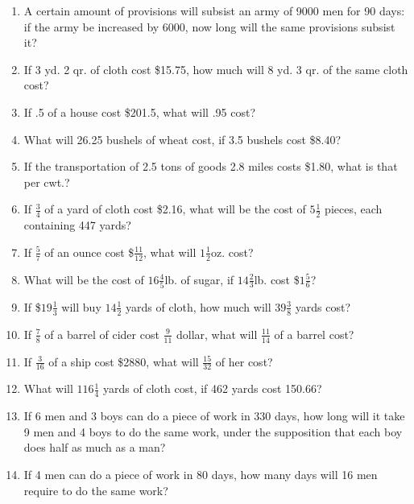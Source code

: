 \documentclass[12pt]{article}
\begin{document}
\begin{enumerate}
\item A certain amount of provisions will subsist an army of 9000 men for 90 days: if the army be increased by 6000, now long will the same provisions subsist it? 
\spacing

\item If 3 yd. 2 qr. of cloth cost \$15.75, how much will 8 yd. 3 qr. of the same cloth cost? 
\spacing

\item If .5 of a house cost \$201.5, what will .95 cost?  
\spacing

\item What will 26.25 bushels of wheat cost, if 3.5 bushels cost \$8.40? 
\spacing

\item If the transportation of 2.5 tons of goods 2.8 miles costs \$1.80, what is that per cwt.? 
\spacing

\item If $\frac{3}{4}$ of a yard of cloth cost \$2.16, what will be the cost of $5\frac{1}{2}$ pieces, each containing 447 yards? 
\spacing

\item If $\frac{5}{7}$ of an ounce cost \$$\frac{11}{12}$, what will $1\frac{1}{2}$oz. cost? 
\spacing

\item What will be the cost of $16\frac{4}{5}$lb. of sugar, if $14\frac{2}{3}$lb. cost \$$1\frac{5}{6}$? 
\spacing

\item If \$$19\frac{1}{3}$ will buy $14\frac{1}{2}$ yards of cloth, how much will $39\frac{3}{8}$ yards cost? 
\spacing

\item If $\frac{7}{8}$ of a barrel of cider cost $\frac{9}{11}$ dollar, what will $\frac{11}{14}$ of a barrel cost? 
\spacing

\item If $\frac{3}{16}$ of a ship cost \$2880, what will $\frac{15}{32}$ of her cost? 
\spacing

\item What will $116\frac{1}{4}$ yards of cloth cost, if 462 yards cost 150.66? 
\spacing

\item If 6 men and 3 boys can do a piece of work in 330 days, how long will it take 9 men and 4 boys to do the same work, under the supposition that each boy does half as much as a man? 
\spacing

\item If 4 men can do a piece of work in 80 days, how many days will 16 men require to do the same work? 
\spacing


\end{enumerate}
\end{document}
